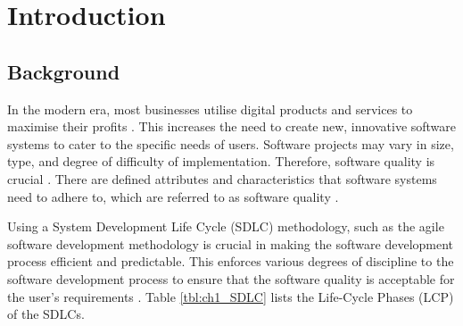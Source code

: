 \chapter{Introduction}
\label{chap:1}

\section{Background}\label{section:ch1_background}
In the modern era, most businesses utilise digital products and services to maximise their profits \cite{Gralha2018}. This increases the need to create new, innovative software systems to cater to the specific needs of users. Software projects may vary in size, type, and degree of difficulty of implementation. Therefore, software quality is crucial \cite{Khan2013}. There are defined attributes and characteristics that software systems need to adhere to, which are referred to as software quality \cite{Khan2013}.\par Using a System Development Life Cycle (SDLC) methodology, such as the agile software development methodology is crucial in making the software development process efficient and predictable. This enforces various degrees of discipline to the software development process to ensure that the software quality is acceptable for the user's requirements \cite{Khan2013, Al-Saiyd2015}. Table \ref{tbl:ch1_SDLC} lists the Life-Cycle Phases (LCP) of the SDLCs.

